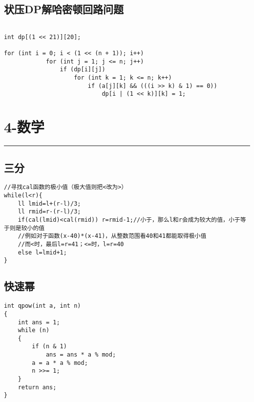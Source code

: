 \documentclass[]{article}
\begin{document}
\hypertarget{ux72b6ux538bdpux89e3ux54c8ux5bc6ux987fux56deux8defux95eeux9898}{%
\subsection{状压DP解哈密顿回路问题}\label{ux72b6ux538bdpux89e3ux54c8ux5bc6ux987fux56deux8defux95eeux9898}}

\begin{verbatim}

int dp[(1 << 21)][20];

for (int i = 0; i < (1 << (n + 1)); i++)
            for (int j = 1; j <= n; j++)
                if (dp[i][j])
                    for (int k = 1; k <= n; k++)
                        if (a[j][k] && (((i >> k) & 1) == 0))
                            dp[i | (1 << k)][k] = 1;

\end{verbatim}

\hypertarget{ux6570ux5b66}{%
\section{4-数学}\label{ux6570ux5b66}}

\begin{center}\rule{0.5\linewidth}{0.5pt}\end{center}

\hypertarget{ux4e09ux5206-1}{%
\subsection{三分}\label{ux4e09ux5206-1}}

\begin{verbatim}
//寻找cal函数的极小值（极大值则把<改为>）
while(l<r){
    ll lmid=l+(r-l)/3;
    ll rmid=r-(r-l)/3;
    if(cal(lmid)<cal(rmid)) r=rmid-1;//小于，那么l和r会成为较大的值，小于等于则是较小的值
    //例如对于函数(x-40)*(x-41)，从整数范围看40和41都能取得极小值
    //而<时，最后l=r=41；<=时，l=r=40
    else l=lmid+1;
}
\end{verbatim}

\hypertarget{ux5febux901fux5e42}{%
\subsection{快速幂}\label{ux5febux901fux5e42}}

\begin{verbatim}
int qpow(int a, int n)
{
    int ans = 1;
    while (n)
    {
        if (n & 1)
            ans = ans * a % mod;
        a = a * a % mod;
        n >>= 1;
    }
    return ans;
}
\end{verbatim}
\end{document}
